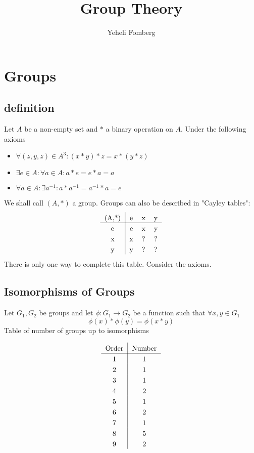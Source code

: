 \documentclass{article}
\title{\textbf{Group Theory}}
\author{Yeheli Fomberg}
\date{}
\begin{document}
	\maketitle
	\newpage
	\section{Groups}
	\subsection{definition}
	Let $A$ be a non-empty set and $*$ a binary operation on $A$. Under the following axioms
	\begin{itemize}
		\item $\forall (z,y,z)\in A^3:(x*y)*z=x*(y*z)$
		\item $\exists e\in A:\forall a\in A:a*e=e*a=a$
		\item $\forall a\in A:\exists a^{-1}:a*a^{-1}=a^{-1}*a=e$
	\end{itemize}
	We shall call $(A,*)$ a group. Groups can also be described in "Cayley tables":
	\[
\setlength\extrarowheight{3pt}
\begin{tabular}{c | c c c}
    (A,*) & e & x & y \\
    \cline{1-4}
    e & e & x & y \\
    x & x & ? & ? \\
    y & y & ? & ? 
\end{tabular}
	\]
	There is only one way to complete this table. Consider the axioms.
	
	\subsection{Isomorphisms of Groups}
	Let $G_1,G_2$ be groups and let $\phi:G_1\to G_2$ be a function such that $\forall x,y\in G_1$
	\[
		\phi(x)*\phi(y) = \phi(x*y)
	\] 
	Table of number of groups up to isomorphisms
	
	\[
\setlength\extrarowheight{3pt}
\begin{tabular}{c | c}
    \text{Order} & \text{Number} \\
    \cline{1-2}
    1 & 1 \\
    2 & 1 \\
    3 & 1 \\
    4 & 2 \\
    5 & 1 \\
    6 & 2 \\
    7 & 1 \\
    8 & 5 \\
    9 & 2
\end{tabular}
	\]
	
\end{document}
